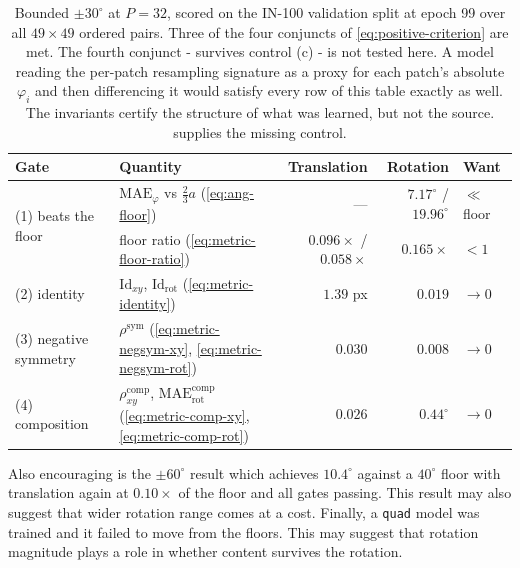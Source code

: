 \documentclass[final_report.tex]{subfiles}
\begin{document}
\begin{table}[htbp]
  \centering
  \caption[The intrinsic gates at $P = 32$]{Bounded $\pm 30^\circ$ at $P = 32$, scored on
  the IN-100 validation split at epoch 99 over all $49 \times 49$ ordered pairs. Three of
  the four conjuncts of \cref{eq:positive-criterion} are met. The fourth conjunct - survives control
  (c) - is not tested here. A model reading the
  per-patch resampling signature as a proxy for each patch's absolute $\varphi_i$ and then
  differencing it would satisfy every row of this table exactly as well. The invariants
  certify the structure of what was learned, but not the source.
   supplies the missing control.}
  \label{tab:gates-p32-b30}
  \footnotesize
  \begin{tabular}{@{}l l r r l@{}}
    \toprule
    Gate & Quantity & Translation & Rotation & Want \\
    \midrule
    \multirow{2}{*}{(1) beats the floor}
      & $\mathrm{MAE}_\varphi$ vs $\tfrac{2}{3}a$ (\cref{eq:ang-floor})
        & ---                        & $7.17^\circ$ / $19.96^\circ$ & $\ll$ floor \\
      & floor ratio (\cref{eq:metric-floor-ratio})
        & $0.096\times$ / $0.058\times$ & $0.165\times$             & $< 1$ \\
    \addlinespace
    (2) identity
      & $\mathrm{Id}_{xy}$, $\mathrm{Id}_{\mathrm{rot}}$ (\cref{eq:metric-identity})
        & $1.39$ px                  & $0.019$                      & $\to 0$ \\
    \addlinespace
    (3) negative symmetry
      & $\rho^{\mathrm{sym}}$ (\cref{eq:metric-negsym-xy}, \cref{eq:metric-negsym-rot})
        & $0.030$                    & $0.008$                      & $\to 0$ \\
    \addlinespace
    (4) composition
      & $\rho^{\mathrm{comp}}_{xy}$, $\mathrm{MAE}^{\mathrm{comp}}_{\mathrm{rot}}$
        (\cref{eq:metric-comp-xy}, \cref{eq:metric-comp-rot})
        & $0.026$                    & $0.44^\circ$                 & $\to 0$ \\
    \bottomrule
  \end{tabular}
\end{table}


Also encouraging is the $\pm60^\circ$ result which achieves $10.4^\circ$ against a $40^\circ$ floor with translation again at $0.10\times$ of the floor and all gates passing. This result may also suggest that wider rotation range comes at a cost. Finally, a \texttt{quad} model was trained and it failed to move from the floors. This may suggest that rotation magnitude plays a role in whether content survives the rotation.
\end{document}
